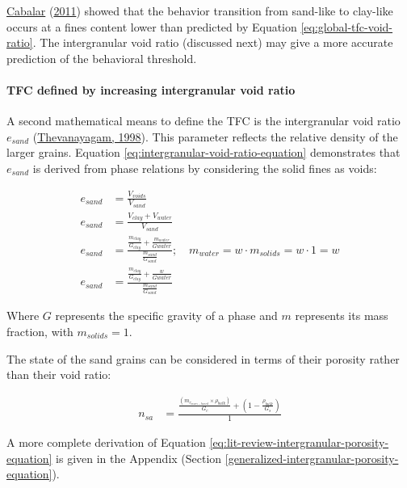 \documentclass[
  letterpaper,
  openany]{book}
\begin{document}
\protect\hyperlink{ref-Cabalar2011}{Cabalar} (\protect\hyperlink{ref-Cabalar2011}{2011}) showed that the behavior transition from sand-like to clay-like occurs at a fines content lower than predicted by Equation \eqref{eq:global-tfc-void-ratio}.
The intergranular void ratio (discussed next) may give a more accurate prediction of the behavioral threshold.

\hypertarget{tfc-defined-by-increasing-intergranular-void-ratio}{%
\paragraph{TFC defined by increasing intergranular void ratio}\label{tfc-defined-by-increasing-intergranular-void-ratio}}

A second mathematical means to define the TFC is the intergranular void ratio \(e_{sand}\) (\protect\hyperlink{ref-Thevanayagam1998}{Thevanayagam, 1998}).
This parameter reflects the relative density of the larger grains.
Equation \eqref{eq:intergranular-void-ratio-equation} demonstrates that \(e_{sand}\) is derived from phase relations by considering the solid fines as voids:

\begin{align}
e_{sand} &= \frac{V_{voids}}{V_{sand}} \nonumber \\
e_{sand} &= \frac{V_{clay} + V_{water}}{V_{sand}} \nonumber \\
e_{sand} &= \frac{\frac{m_{clay}}{G_{clay}} + \frac{m_{water}}{Gwater}}{\frac{m_{sand}}{G_{sand}}}; \quad m_{water} = w \cdot m_{solids} = w \cdot 1 = w \nonumber \\
e_{sand} &= \frac{\frac{m_{clay}}{G_{clay}} + \frac{{w}}{Gwater}}{\frac{m_{sand}}{G_{sand}}}
\label{eq:intergranular-void-ratio-equation}
\end{align}

Where \(G\) represents the specific gravity of a phase and \(m\) represents its mass fraction, with \(m_{solids} = 1\).

The state of the sand grains can be considered in terms of their porosity rather than their void ratio:

\begin{align}
n_{sa}&=\frac{\frac{\left( m_{c_{mass-based}} \times  \rho_{bulk} \right)}{G_c}+\left( 1 - \frac{\rho_{bulk}}{G_s} \right)}{1}
\label{eq:lit-review-intergranular-porosity-equation}
\end{align}

A more complete derivation of Equation \eqref{eq:lit-review-intergranular-porosity-equation} is given in the Appendix (Section \ref{generalized-intergranular-porosity-equation}).
\end{document}
